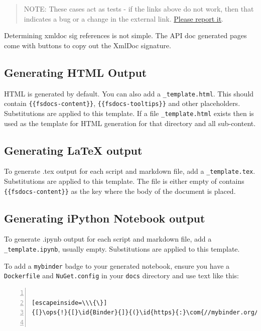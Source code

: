 \documentclass{article}
\newcommand{\id}[1]{\textcolor{black}{#1}}
\newcommand{\com}[1]{\textcolor{officegreen}{#1}}
\newcommand{\ops}[1]{\textcolor{purple}{#1}}
\begin{document}
\begin{quote}


NOTE: These cases act as tests - if the links above do not work, then that indicates a bug or a change in the
external link. \href{https://github.com/fsprojects/FSharp.Formatting/issues/new}{Please report it}.
\end{quote}



Determining xmldoc sig references is not simple.  The API doc generated pages come with
buttons to copy out the XmlDoc signature.
\subsection*{Generating HTML Output}



HTML is generated by default. You can also add a \texttt{\_template.html}.  This should contain \texttt{\{\{fsdocs-content\}\}},  \texttt{\{\{fsdocs-tooltips\}\}}
and other placeholders. Substitutions are
applied to this template.
If a file \texttt{\_template.html} exists then is used as the template for HTML generation for that directory and all sub-content.
\subsection*{Generating LaTeX output}



To generate .tex output for each script and markdown file, add a \texttt{\_template.tex}. Substitutions are
applied to this template. The file is either empty of contains \texttt{\{\{fsdocs-content\}\}} as the key where the body
of the document is placed.
\subsection*{Generating iPython Notebook output}



To generate .ipynb output for each script and markdown file, add a \texttt{\_template.ipynb}, usually empty. Substitutions are
applied to this template.


To add a \texttt{mybinder} badge to your generated notebook, ensure you have a \texttt{Dockerfile} and \texttt{NuGet.config}
in your \texttt{docs} directory and use text like this:
\begin{lstlisting}[numbers=left]

[escapeinside=\\\{\}]
{[}\ops{!}{[}\id{Binder}{]}{(}\id{https}{:}\com{//mybinder.org/badge\_logo.svg)](https://mybinder.org/v2/gh/fsprojects/FSharp.Formatting/gh-pages?filepath=literate.ipynb)}


\end{lstlisting}
\end{document}
